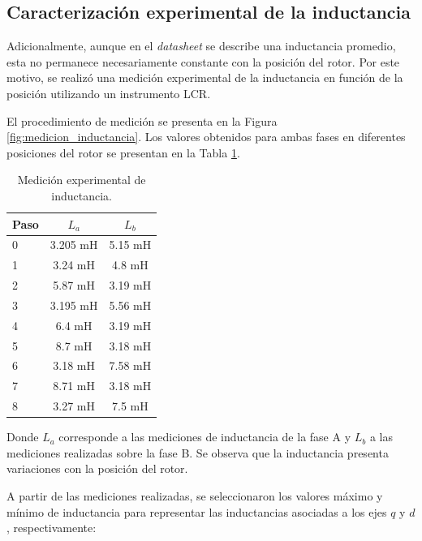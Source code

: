 \subsection{Caracterización experimental de la inductancia}

Adicionalmente, aunque en el \textit{datasheet} se describe una
inductancia promedio, esta no permanece necesariamente constante con la
posición del rotor. Por este motivo, se realizó una medición experimental
de la inductancia en función de la posición utilizando un instrumento
LCR.

El procedimiento de medición se presenta en la Figura
\ref{fig:medicion_inductancia}. Los valores obtenidos para ambas fases en
diferentes posiciones del rotor se presentan en la Tabla
\ref{tab:medicion_inductancia}.


\begin{table}[htbp]
    \centering
    \caption{Medición experimental de inductancia.}
    \label{tab:medicion_inductancia}

    \begin{tabular}{|l|c|c|}
        \hline
        \textbf{Paso} &
        \textbf{$L_a$} &
        \textbf{$L_b$}
        \\ \hline

        0 & 3.205 mH & 5.15 mH \\ \hline
        1 & 3.24 mH  & 4.8 mH  \\ \hline
        2 & 5.87 mH  & 3.19 mH \\ \hline
        3 & 3.195 mH & 5.56 mH \\ \hline
        4 & 6.4 mH   & 3.19 mH \\ \hline
        5 & 8.7 mH   & 3.18 mH \\ \hline
        6 & 3.18 mH  & 7.58 mH \\ \hline
        7 & 8.71 mH  & 3.18 mH \\ \hline
        8 & 3.27 mH  & 7.5 mH  \\ \hline
    \end{tabular}
\end{table}


Donde $L_a$ corresponde a las mediciones de inductancia de la fase A y
$L_b$ a las mediciones realizadas sobre la fase B. Se observa que la
inductancia presenta variaciones con la posición del rotor.

A partir de las mediciones realizadas, se seleccionaron los valores
máximo y mínimo de inductancia para representar las inductancias
asociadas a los ejes $q$ y $d$, respectivamente:

